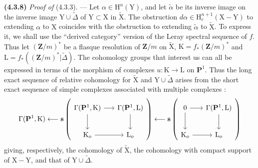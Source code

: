 \documentclass[11pt,leqno]{article}
\begin{document}
\textbf{(4.3.8)} \textit{Proof of} (4.3.3). — Let \(\alpha\in\mathrm{H}^n(\mathrm{Y})\), and let \(\widetilde{\alpha}\) be its inverse image on the inverse image \(\mathrm{Y}\cup\widetilde{\Delta}\) of \(\mathrm{Y}\subset\mathrm{X}\) in \(\widetilde{\mathrm{X}}\). The obstruction \(d\alpha\in\mathrm{H}_c^{n+1}(\mathrm{X}-\mathrm{Y})\) to extending \(\alpha\) to \(\mathrm{X}\) coincides with the obstruction to extending \(\widetilde{\alpha}\) to \(\widetilde{\mathrm{X}}\). To express it, we shall use the “derived category” version of the Leray spectral sequence of \(f\). Thus let \((\mathbf{Z}/m)^*\) be a flasque resolution of \(\mathbf{Z}/m\) on \(\widetilde{\mathrm{X}}\), \(\mathrm{K}=f_*(\mathbf{Z}/m)^*\) and \(\mathrm{L}=f_*((\mathbf{Z}/m)^*|\widetilde{\Delta})\). The cohomology groups that interest us can all be expressed in terms of the morphism of complexes \(u:\mathrm{K}\to\mathrm{L}\) on \(\mathbf{P}^1\). Thus the long exact sequence of relative cohomology for \(\widetilde{\mathrm{X}}\) and \(\mathrm{Y}\cup\widetilde{\Delta}\) arises from the short exact sequence of simple complexes associated with multiple complexes :
\[
\Gamma(\mathbf{P}^1,\mathrm{K})
\longleftarrow
\mathbf{s}\left(
\begin{tikzcd}[ampersand replacement=\&, column sep=1.5em, row sep=2.2em]
\Gamma(\mathbf{P}^1,\mathrm{K}) \arrow[r] \arrow[d]
  \& \Gamma(\mathbf{P}^1,\mathrm{L}) \arrow[d] \\
\mathrm{K}_o \arrow[r] \& \mathrm{L}_o
\end{tikzcd}
\right)
\longleftarrow
\mathbf{s}\left(
\begin{tikzcd}[ampersand replacement=\&, column sep=1.5em, row sep=2.2em]
0 \arrow[r] \arrow[d]
  \& \Gamma(\mathbf{P}^1,\mathrm{L}) \arrow[d] \\
\mathrm{K}_o \arrow[r] \& \mathrm{L}_o
\end{tikzcd}
\right)
\]
giving, respectively, the cohomology of \(\widetilde{\mathrm{X}}\), the cohomology with compact support of \(\mathrm{X}-\mathrm{Y}\), and that of \(\mathrm{Y}\cup\widetilde{\Delta}\).
\end{document}
